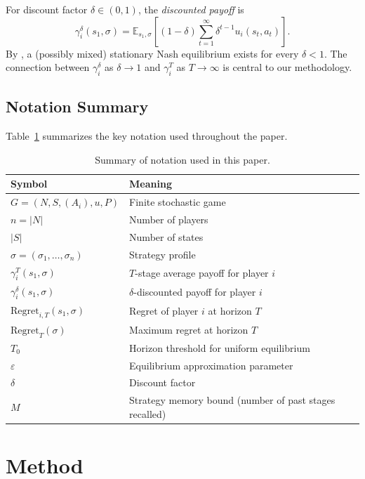 \documentclass[11pt,a4paper]{article}
\theoremstyle{definition}
\newcommand{\E}{\mathbb{E}}
\newcommand{\eps}{\varepsilon}
\newcommand{\Regret}{\mathrm{Regret}}
\begin{document}
For discount factor $\delta \in (0,1)$, the \emph{discounted payoff} is
\[
\gamma_i^\delta(s_1, \sigma) = \E_{s_1,\sigma}\!\left[(1-\delta)\sum_{t=1}^{\infty} \delta^{t-1} u_i(s_t, a_t)\right].
\]
By \citet{fink1964equilibrium}, a (possibly mixed) stationary Nash equilibrium exists for every $\delta < 1$.
The connection between $\gamma_i^\delta$ as $\delta \to 1$ and $\gamma_i^T$ as $T \to \infty$ is central to our methodology.

\subsection{Notation Summary}

Table~\ref{tab:notation} summarizes the key notation used throughout the paper.

\begin{table}[t]
\centering
\caption{Summary of notation used in this paper.}\label{tab:notation}
\small
\begin{tabular}{@{}ll@{}}
\toprule
\textbf{Symbol} & \textbf{Meaning} \\
\midrule
$G = (N, S, (A_i), u, P)$ & Finite stochastic game \\
$n = |N|$ & Number of players \\
$|S|$ & Number of states \\
$\sigma = (\sigma_1, \ldots, \sigma_n)$ & Strategy profile \\
$\gamma_i^T(s_1, \sigma)$ & $T$-stage average payoff for player $i$ \\
$\gamma_i^\delta(s_1, \sigma)$ & $\delta$-discounted payoff for player $i$ \\
$\Regret_{i,T}(s_1, \sigma)$ & Regret of player $i$ at horizon $T$ \\
$\Regret_T(\sigma)$ & Maximum regret at horizon $T$ \\
$T_0$ & Horizon threshold for uniform equilibrium \\
$\eps$ & Equilibrium approximation parameter \\
$\delta$ & Discount factor \\
$M$ & Strategy memory bound (number of past stages recalled) \\
\bottomrule
\end{tabular}
\end{table}

\section{Method}\label{sec:method}
\end{document}
